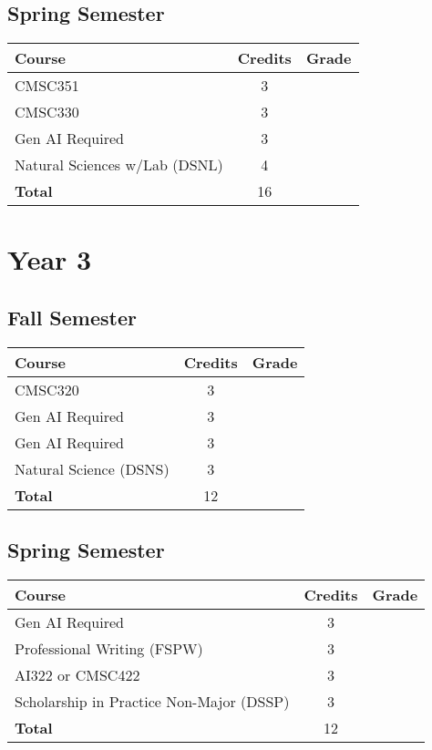 \subsection*{Spring Semester}
\begin{tabular}{|l|c|c|}
    \hline
    Course & Credits & Grade \\
    \hline
    CMSC351 & 3 & \\
    CMSC330 & 3 & \\
    Gen AI Required & 3 & \\
    Natural Sciences w/Lab (DSNL) & 4 & \\
    \hline
    \textbf{Total} & 16 & \\
    \hline
\end{tabular}

\section*{Year 3}
\subsection*{Fall Semester}
\begin{tabular}{|l|c|c|}
    \hline
    Course & Credits & Grade \\
    \hline
    CMSC320 & 3 & \\
    Gen AI Required & 3 & \\
    Gen AI Required & 3 & \\
    Natural Science (DSNS) & 3 & \\
    \hline
    \textbf{Total} & 12 & \\
    \hline
\end{tabular}

\subsection*{Spring Semester}
\begin{tabular}{|l|c|c|}
    \hline
    Course & Credits & Grade \\
    \hline
    Gen AI Required & 3 & \\
    Professional Writing (FSPW) & 3 & \\
    AI322 or CMSC422 & 3 & \\
    Scholarship in Practice Non-Major (DSSP) & 3 & \\
    \hline
    \textbf{Total} & 12 & \\
    \hline
\end{tabular}

